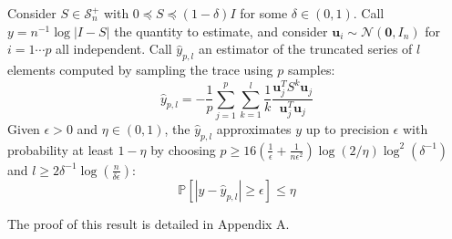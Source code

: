 \begin{theorem}
\label{thm:det-sampling-theorem}Consider $S\in\mathcal{S}_{n}^{+}$
with $0\preceq S\preceq\left(1-\delta\right)I$ for some $\delta\in\left(0,1\right)$.
Call $y=n^{-1}\log\left|I-S\right|$ the quantity to estimate, and
consider $\mathbf{u}_{i}\sim\mathcal{N}\left(\mathbf{0},I_{n}\right)$
for $i=1\cdots p$ all independent. Call $\hat{y}_{p,l}$ an estimator
of the truncated series of $l$ elements computed by sampling the
trace using $p$ samples: 
\[
\hat{y}_{p,l}=-\frac{1}{p}\sum_{j=1}^{p}\sum_{k=1}^{l}\frac{1}{k}\frac{\mathbf{u}_{j}^{T}S^{k}\mathbf{u}_{j}}{\mathbf{u}_{j}^{T}\mathbf{u}_{j}}
\]
Given $\epsilon>0$ and $\eta\in\left(0,1\right)$, the $\hat{y}_{p,l}$
approximates $y$ up to precision $\epsilon$ with probability at
least $1-\eta$ by choosing $p\geq16\left(\frac{1}{\epsilon}+\frac{1}{n\epsilon^{2}}\right)\log\left(2/\eta\right)\log^{2}\left(\delta^{-1}\right)$
and $l\geq2\delta^{-1}\log\left(\frac{n}{\delta\epsilon}\right)$:
\[
\mathbb{P}\left[\left|y-\hat{y}_{p,l}\right|\geq\epsilon\right]\leq\eta
\]

\end{theorem}
The proof of this result is detailed in Appendix A.

